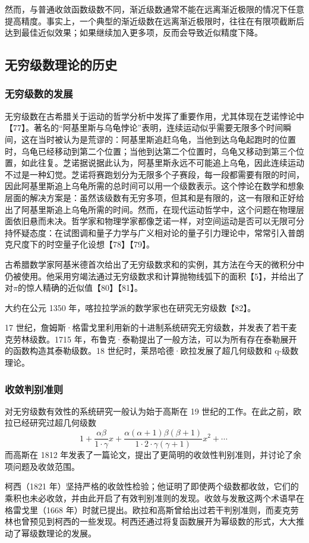 然而，与普通收敛函数级数不同，渐近级数通常不能在远离渐近极限的情况下任意提高精度。事实上，一个典型的渐近级数在远离渐近极限时，往往在有限项截断后达到最佳近似效果；如果继续加入更多项，反而会导致近似精度下降。
\subsection{无穷级数理论的历史}
\subsubsection{无穷级数的发展}
无穷级数在古希腊关于运动的哲学分析中发挥了重要作用，尤其体现在芝诺悖论中【77】。著名的“阿基里斯与乌龟悖论”表明，连续运动似乎需要无限多个时间瞬间，这在当时被认为是荒谬的：阿基里斯追赶乌龟，当他到达乌龟起跑时的位置时，乌龟已经移动到第二个位置；当他到达第二个位置时，乌龟又移动到第三个位置，如此往复。芝诺据说据此认为，阿基里斯永远不可能追上乌龟，因此连续运动不过是一种幻觉。芝诺将赛跑划分为无限多个子赛段，每一段都需要有限的时间，因此阿基里斯追上乌龟所需的总时间可以用一个级数表示。这个悖论在数学和想象层面的解决方案是：虽然该级数有无穷多项，但其和是有限的，这一有限和正好给出了阿基里斯追上乌龟所需的时间。然而，在现代运动哲学中，这个问题在物理层面依旧悬而未决。哲学家和物理学家都像芝诺一样，对空间运动是否可以无限可分持怀疑态度：在试图调和量子力学与广义相对论的量子引力理论中，常常引入普朗克尺度下的时空量子化设想【78】【79】。

古希腊数学家阿基米德首次给出了无穷级数求和的实例，其方法在今天的微积分中仍被使用。他采用穷竭法通过无穷级数求和计算抛物线弧下的面积【5】，并给出了对$\pi$的惊人精确的近似值【80】【81】。

大约在公元 1350 年，喀拉拉学派的数学家也在研究无穷级数【82】。

17 世纪，詹姆斯·格雷戈里利用新的十进制系统研究无穷级数，并发表了若干麦克劳林级数。1715 年，布鲁克·泰勒提出了一般方法，可以为所有存在泰勒展开的函数构造其泰勒级数。18 世纪时，莱昂哈德·欧拉发展了超几何级数和 q-级数理论。
\subsubsection{收敛判别准则}
对无穷级数有效性的系统研究一般认为始于高斯在 19 世纪的工作。在此之前，欧拉已经研究过超几何级数
$$
1+\frac{\alpha \beta}{1 \cdot \gamma}x + \frac{\alpha (\alpha + 1)\beta (\beta + 1)}{1 \cdot 2 \cdot \gamma (\gamma + 1)}x^{2} + \cdots~
$$
而高斯在 1812 年发表了一篇论文，提出了更简明的收敛性判别准则，并讨论了余项问题及收敛范围。

柯西（1821 年）坚持严格的收敛性检验；他证明了即使两个级数都收敛，它们的乘积也未必收敛，并由此开启了有效判别准则的发现。收敛与发散这两个术语早在格雷戈里（1668 年）时就已提出。欧拉和高斯曾给出过若干判别准则，而麦克劳林也曾预见到柯西的一些发现。柯西还通过将复函数展开为幂级数的形式，大大推动了幂级数理论的发展。

